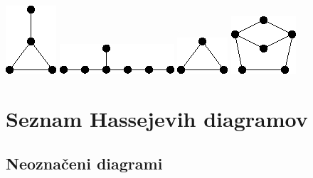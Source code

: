 \documentclass[11pt,paper=b5,footinclude,headinclude]{scrbook} %
\begin{document}
{\includegraphics[scale=0.5,frame]{smallGraphs/g_paw.png}     
\includegraphics[scale=0.5,frame]{smallGraphs/g_skewstar.png}     
\includegraphics[scale=0.5,frame]{smallGraphs/g_triangle.png}     
\includegraphics[scale=0.5,frame]{smallGraphs/g_twinC5.png}    
}
\chapter{Seznam Hassejevih diagramov}
\section{Neoznačeni diagrami\hfill\label{sec:hasse}}
\end{document}

